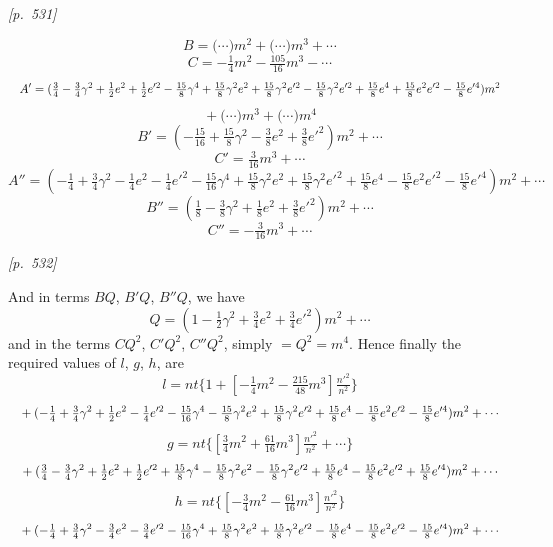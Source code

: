 \documentclass[11pt]{article}
\begin{document}

\bigskip
\noindent\textit{[p.~531]}

\medskip

\[
B=\bigl(\cdots\bigr)m^2 + \bigl(\cdots\bigr)m^3 + \cdots
\]
\[
C=-\tfrac{1}{4}m^2 - \tfrac{105}{16}m^3 - \cdots
\]
\[
\resizebox{\textwidth}{!}{$\displaystyle A'=(\tfrac{3}{4}-\tfrac{3}{4}\gamma^2+\tfrac{1}{2}e^2+\tfrac{1}{2}e'^2-\tfrac{15}{8}\gamma^4+\tfrac{15}{8}\gamma^2 e^2+\tfrac{15}{8}\gamma^2 e'^2-\tfrac{15}{8}\gamma^2 e'^2+\tfrac{15}{8}e^4+\tfrac{15}{8}e^2 e'^2-\tfrac{15}{8}e'^4)m^2$}
\]
\[
{}+\bigl(\cdots\bigr)m^3+\bigl(\cdots\bigr)m^4
\]
\[
B'=(-\tfrac{15}{16}+\tfrac{15}{8}\gamma^2-\tfrac{3}{8}e^2+\tfrac{3}{8}e'^2)m^2+\cdots
\]
\[
C'=\tfrac{3}{16}m^3+\cdots
\]
\[
A''=(-\tfrac{1}{4}+\tfrac{3}{4}\gamma^2-\tfrac{1}{4}e^2-\tfrac{1}{4}e'^2-\tfrac{15}{16}\gamma^4+\tfrac{15}{8}\gamma^2 e^2+\tfrac{15}{8}\gamma^2 e'^2+\tfrac{15}{8}e^4-\tfrac{15}{8}e^2 e'^2-\tfrac{15}{8}e'^4)m^2+\cdots
\]
\[
B''=(\tfrac{1}{8}-\tfrac{3}{8}\gamma^2+\tfrac{1}{8}e^2+\tfrac{3}{8}e'^2)m^2+\cdots
\]
\[
C''=-\tfrac{3}{16}m^3+\cdots
\]


\bigskip
\noindent\textit{[p.~532]}

\medskip

And in terms $BQ$, $B'Q$, $B''Q$, we have
\[
Q=(1-\tfrac{1}{2}\gamma^2+\tfrac{3}{4}e^2+\tfrac{3}{4}e'^2)m^2+\cdots
\]
and in the terms $CQ^2$, $C'Q^2$, $C''Q^2$, simply $=Q^2=m^4$. Hence
finally the required values of $l$, $g$, $h$, are
\[
l=nt\{1+[-\tfrac{1}{4}m^2-\tfrac{215}{48}m^3]\tfrac{n'^2}{n^2}\}
\]
\[
\resizebox{\textwidth}{!}{$\displaystyle {}+(-\tfrac{1}{4}+\tfrac{3}{4}\gamma^2+\tfrac{1}{2}e^2-\tfrac{1}{4}e'^2-\tfrac{15}{16}\gamma^4-\tfrac{15}{8}\gamma^2 e^2+\tfrac{15}{8}\gamma^2 e'^2+\tfrac{15}{8}e^4-\tfrac{15}{8}e^2 e'^2-\tfrac{15}{8}e'^4)m^2 + \cdots$}
\]
\[
g=nt\bigl\{[\tfrac{3}{4}m^2+\tfrac{61}{16}m^3]\tfrac{n'^2}{n^2}+\cdots\bigr\}
\]
\[
\resizebox{\textwidth}{!}{$\displaystyle {}+(\tfrac{3}{4}-\tfrac{3}{4}\gamma^2+\tfrac{1}{2}e^2+\tfrac{1}{2}e'^2+\tfrac{15}{8}\gamma^4-\tfrac{15}{8}\gamma^2 e^2-\tfrac{15}{8}\gamma^2 e'^2+\tfrac{15}{8}e^4-\tfrac{15}{8}e^2 e'^2+\tfrac{15}{8}e'^4)m^2+\cdots$}
\]
\[
h=nt\{[-\tfrac{3}{4}m^2-\tfrac{61}{16}m^3]\tfrac{n'^2}{n^2}\}
\]
\[
\resizebox{\textwidth}{!}{$\displaystyle {}+(-\tfrac{1}{4}+\tfrac{3}{4}\gamma^2-\tfrac{3}{4}e^2-\tfrac{3}{4}e'^2-\tfrac{15}{16}\gamma^4+\tfrac{15}{8}\gamma^2 e^2+\tfrac{15}{8}\gamma^2 e'^2-\tfrac{15}{8}e^4-\tfrac{15}{8}e^2 e'^2-\tfrac{15}{8}e'^4)m^2+\cdots$}
\]
\end{document}
